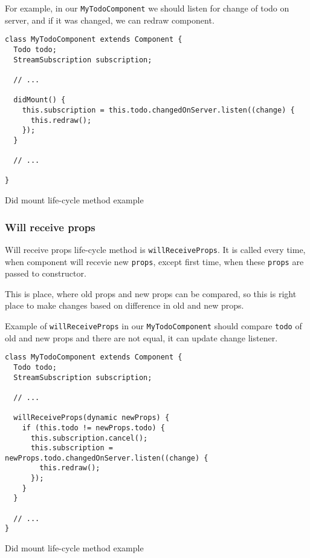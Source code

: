       For example, in our \texttt{MyTodoComponent} we should listen for change of todo on server, 
      and if it was changed, we can redraw component.
      \begin{listing}[H]
        \begin{verbatim}
class MyTodoComponent extends Component {
  Todo todo;
  StreamSubscription subscription;

  // ...

  didMount() {
    this.subscription = this.todo.changedOnServer.listen((change) {
      this.redraw();
    });
  }

  // ...

}
        \end{verbatim}
        \caption{Did mount life-cycle method example}
        \label{subsec:our-architecture-lifecycle-didmount-example}
      \end{listing}

    \subsubsection{Will receive props}\label{subsec:our-architecture-lifecycle-willreceiveprops}

      Will receive props life-cycle method is \texttt{willReceiveProps}. 
      It is called every time, when component will recevie new \texttt{props}, 
      except first time, when these \texttt{props} are passed to constructor.

      This is place, where old props and new props can be compared, 
      so this is right place to make changes based on difference in old and new props.

      Example of \texttt{willReceiveProps} in our \texttt{MyTodoComponent} 
      should compare \texttt{todo} of old and new props and there are not equal, 
      it can update change listener.
      \begin{listing}[H]
        \begin{verbatim}
class MyTodoComponent extends Component {
  Todo todo;
  StreamSubscription subscription;

  // ...

  willReceiveProps(dynamic newProps) {
    if (this.todo != newProps.todo) {
      this.subscription.cancel();
      this.subscription = newProps.todo.changedOnServer.listen((change) {
        this.redraw();
      });
    }
  }

  // ...
}
        \end{verbatim}
        \caption{Did mount life-cycle method example}
        \label{subsec:our-architecture-lifecycle-didmount-example}
      \end{listing}
      
